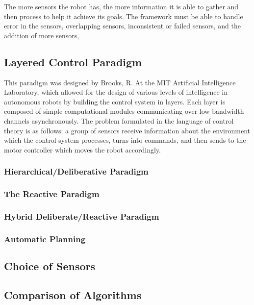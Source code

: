 The more sensors the robot has, the more information it is able to gather and then process to help it achieve its goals. The framework must be able to handle error in the sensors, overlapping sensors, inconsistent or failed sensors, and the addition of more sensors, 

\subsection*{Layered Control Paradigm \cite{Brooks:1985}}
This paradigm was designed by Brooks, R. At the MIT Artificial Intelligence Laboratory, which allowed for the design of various levels of intelligence in autonomous robots by building the control system in layers. Each layer is composed of simple computational modules communicating over low bandwidth channels asynchronously. The problem formulated in the language of control theory is as follows: a group of sensors receive information about the environment which the control system processes, turns into commands, and then sends to the motor controller which moves the robot accordingly.

\subsubsection*{Hierarchical/Deliberative Paradigm}
\subsubsection*{The Reactive Paradigm}
\subsubsection*{Hybrid Deliberate/Reactive Paradigm}
\subsubsection*{Automatic Planning}

\subsection*{Choice of Sensors}

\subsection*{Comparison of Algorithms}






